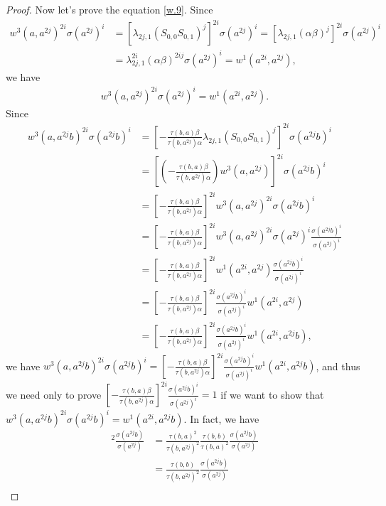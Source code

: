 \documentclass[a4paper,11pt]{amsart}
\numberwithin{equation}{section}
\begin{document}
\begin{proof}
Now let's prove the equation \eqref{w.9}. Since
\begin{align*}
w^3(a,a^{2j})^{2i} \sigma(a^{2j})^i&=[\lambda_{2j,1} (S_{0,0} S_{0,1})^j]^{2i} \sigma(a^{2j})^i=[\lambda_{2j,1} (\alpha\beta)^j]^{2i} \sigma(a^{2j})^i\\
&=\lambda_{2j,1}^{2i} (\alpha\beta)^{2ij} \sigma(a^{2j})^i=w^1(a^{2i},a^{2j}),
\end{align*}
we have
\begin{align}
\label{light7} w^3(a,a^{2j})^{2i} \sigma(a^{2j})^i=w^1(a^{2i},a^{2j}).
\end{align}
Since
\begin{align*}
w^3(a,a^{2j}b)^{2i} \sigma(a^{2j}b)^i&=[-\frac{\tau(b,a)\beta}{\tau(b,a^{2j})\alpha}\lambda_{2j,1} (S_{0,0} S_{0,1})^j]^{2i} \sigma(a^{2j}b)^i\\
&=[(-\frac{\tau(b,a) \beta}{\tau(b,a^{2j}) \alpha}) w^3(a,a^{2j})]^{2i} \sigma(a^{2j}b)^i\\
&=[-\frac{\tau(b,a) \beta}{\tau(b,a^{2j}) \alpha}]^{2i} w^3(a,a^{2j})^{2i} \sigma(a^{2j}b)^i\\
&=[-\frac{\tau(b,a)\beta}{\tau(b,a^{2j})\alpha}]^{2i} w^3(a,a^{2j})^{2i} \sigma(a^{2j})^i \frac{\sigma(a^{2j}b)^i}{\sigma(a^{2j})^i}\\
&=[-\frac{\tau(b,a) \beta}{\tau(b,a^{2j}) \alpha}]^{2i} w^1(a^{2i},a^{2j}) \frac{\sigma(a^{2j}b)^i}{\sigma(a^{2j})^i}\\
&=[-\frac{\tau(b,a) \beta}{\tau(b,a^{2j}) \alpha}]^{2i} \frac{\sigma(a^{2j}b)^i}{\sigma(a^{2j})^i} w^1(a^{2i},a^{2j})\\
&=[-\frac{\tau(b,a) \beta}{\tau(b,a^{2j}) \alpha}]^{2i} \frac{\sigma(a^{2j}b)^i}{\sigma(a^{2j})^i} w^1(a^{2i},a^{2j}b),
\end{align*}
we have $w^3(a,a^{2j}b)^{2i} \sigma(a^{2j}b)^i=[-\frac{\tau(b,a) \beta}{\tau(b,a^{2j}) \alpha}]^{2i} \frac{\sigma(a^{2j}b)^i}{\sigma(a^{2j})^i} w^1(a^{2i},a^{2j}b)$, and thus we need only to
prove $[-\frac{\tau(b,a) \beta}{\tau(b,a^{2j}) \alpha}]^{2i} \frac{\sigma(a^{2j}b)^i}{\sigma(a^{2j})^i}=1$ if we want to show that $w^3(a,a^{2j}b)^{2i} \sigma(a^{2j}b)^i=w^1(a^{2i},a^{2j}b)$. In fact, we have
\begin{align*}
[\frac{\tau(b,a) \beta}{\tau(b,a^{2j}) \alpha}]^2 \frac{\sigma(a^{2j}b)}{\sigma(a^{2j})}&=\frac{\tau(b,a)^2}{\tau(b,a^{2j})^2} \frac{\tau(b,b)}{\tau(b,a)^2} \frac{\sigma(a^{2j}b)}{\sigma(a^{2j})}\\
&=\frac{\tau(b,b)}{\tau(b,a^{2j})^2} \frac{\sigma(a^{2j}b)}{\sigma(a^{2j})}\\

\end{align*}
\end{proof}
\end{document}
